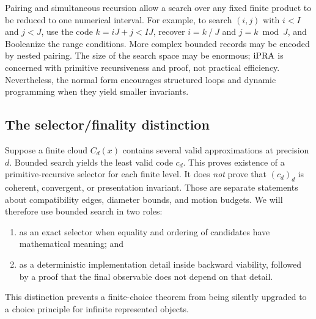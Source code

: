 Pairing and simultaneous recursion allow a search over any fixed finite product to be
reduced to one numerical interval.  For example, to search
\((i,j)\) with \(i<I\) and \(j<J\), use the code \(k=iJ+j<IJ\), recover
\(i=k\mathbin{/}J\) and \(j=k\bmod J\), and Booleanize the range conditions.  More
complex bounded records may be encoded by nested pairing.  The size of the search
space may be enormous; \(\mathrm{iPRA}\) is concerned with primitive recursiveness and proof,
not practical efficiency.  Nevertheless, the normal form encourages structured
loops and dynamic programming when they yield smaller invariants.

\subsection{The selector/finality distinction}

Suppose a finite cloud \(C_d(x)\) contains several valid approximations at precision
\(d\).  Bounded search yields the least valid code \(c_d\).  This proves existence of a
primitive-recursive selector for each finite level.  It does \emph{not} prove that
\((c_d)_d\) is coherent, convergent, or presentation invariant.  Those are separate
statements about compatibility edges, diameter bounds, and motion budgets.  We will
therefore use bounded search in two roles:

\begin{enumerate}[label=(\alph*),leftmargin=2.4em]
\item as an exact selector when equality and ordering of candidates have mathematical
meaning; and
\item as a deterministic implementation detail inside backward viability, followed by
a proof that the final observable does not depend on that detail.
\end{enumerate}

This distinction prevents a finite-choice theorem from being silently upgraded to a
choice principle for infinite represented objects.
